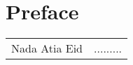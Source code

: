 \newpage
\section*{Preface}

\begin{LARGE}
\begin{tabular}{l l}
Nada Atia Eid & ......... \\

\end{tabular} 
\end{LARGE}
